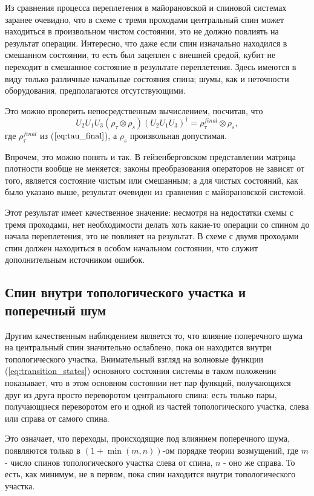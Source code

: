 \documentclass[a4paper,12pt]{article}
\theoremstyle{plain} %
\theoremstyle{definition} %
\theoremstyle{remark} %
\begin{document}
Из сравнения процесса переплетения в майорановской и спиновой системах заранее очевидно, что в схеме с тремя проходами центральный спин может находиться в произвольном чистом состоянии, это не должно повлиять на результат операции.
Интересно, что даже если спин изначально находился в смешанном состоянии, то есть был зацеплен с внешней средой, кубит не переходит в смешанное состояние в результате переплетения. 
Здесь имеются в виду только различные начальные состояния спина; шумы, как и неточности оборудования, предполагаются отсутствующими.

Это можно проверить непосредственным вычислением, посчитав, что
\begin{equation}
    U_2 U_1 U_3 (\rho_\tau \otimes \rho_s) (U_2 U_1 U_3)^\dagger = \rho^{final}_\tau \otimes \rho_s
    \label{eq:u213_general},
\end{equation}
где $\rho^{final}_\tau$ из ($\ref{eq:tau_final}$), а $\rho_s$ произвольная допустимая.

Впрочем, это можно понять и так. В гейзенберговском представлении матрица плотности вообще не меняется; законы преобразования операторов не зависят от того, является состояние чистым или смешанным; а для чистых состояний, как было указано выше, результат очевиден из сравнения с майорановской системой.

Этот результат имеет качественное значение: несмотря на недостатки схемы с тремя проходами, нет необходимости делать хоть какие-то операции со спином до начала переплетения, это не повлияет на результат. 
В схеме с двумя проходами спин должен находиться в особом начальном состоянии, что служит дополнительным источником ошибок.

\subsection{Спин внутри топологического участка и поперечный шум}

Другим качественным наблюдением является то, что влияние поперечного шума на центральный спин значительно ослаблено, пока он находится внутри топологического участка. 
Внимательный взгляд на волновые функции (\ref{eq:transition_states}) основного состояния системы в таком положении показывает, что в этом основном состоянии нет пар функций, получающихся друг из друга просто переворотом центрального спина: есть только пары, получающиеся переворотом его и одной из частей топологического участка, слева или справа от самого спина.

Это означает, что переходы, происходящие под влиянием поперечного шума, появляются только в $(1 + \min(m,n))$-ом порядке теории возмущений, где $m$ - число спинов топологического участка слева от спина, $n$ - оно же справа. 
То есть, как минимум, не в первом, пока спин находится внутри топологического участка.
\end{document}
